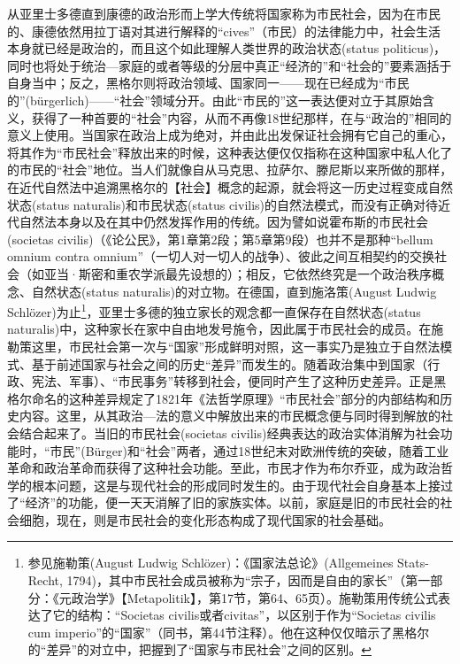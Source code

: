 从亚里士多德直到康德的政治形而上学大传统将国家称为市民社会，因为在市民的、康德依然用拉丁语对其进行解释的“cives”（市民）的法律能力中，社会生活本身就已经是政治的，而且这个如此理解人类世界的政治状态(status politicus)，同时也将处于统治—家庭的或者等级的分层中真正“经济的”和“社会的”要素涵括于自身当中；反之，黑格尔则将政治领域、国家同一——现在已经成为“市民的”(bürgerlich)——“社会”领域分开。由此“市民的”这一表达便对立于其原始含义，获得了一种首要的“社会”内容，从而不再像18世纪那样，在与“政治的”相同的意义上使用。当国家在政治上成为绝对，并由此出发保证社会拥有它自己的重心，将其作为“市民社会”释放出来的时候，这种表达便仅仅指称在这种国家中私人化了的市民的“社会”地位。当人们就像自从马克思、拉萨尔、滕尼斯以来所做的那样，在近代自然法中追溯黑格尔的【社会】概念的起源，就会将这一历史过程变成自然状态(status naturalis)和市民状态(status civilis)的自然法模式，而没有正确对待近代自然法本身以及在其中仍然发挥作用的传统。因为譬如说霍布斯的市民社会(societas civilis)（《论公民》，第1章第2段；第5章第9段）也并不是那种“bellum omnium contra omnium”（一切人对一切人的战争）、彼此之间互相契约的交换社会（如亚当·斯密和重农学派最先设想的）；相反，它依然终究是一个政治秩序概念、自然状态(status naturalis)的对立物。在德国，直到施洛策(August Ludwig Schlözer)为止\footnote{参见施勒策(August Ludwig Schlözer)：《国家法总论》(Allgemeines Stats-Recht, 1794)，其中市民社会成员被称为“宗子，因而是自由的家长”（第一部分：《元政治学》【Metapolitik】，第17节，第64、65页）。施勒策用传统公式表达了它的结构：“Societas civilis或者civitas”，以区别于作为“Societas civilis cum imperio”的“国家”（同书，第44节注释）。他在这种仅仅暗示了黑格尔的“差异”的对立中，把握到了“国家与市民社会”之间的区别。}，亚里士多德的独立家长的观念都一直保存在自然状态(status naturalis)中，这种家长在家中自由地发号施令，因此属于市民社会的成员。在施勒策这里，市民社会第一次与“国家”形成鲜明对照，这一事实乃是独立于自然法模式、基于前述国家与社会之间的历史“差异”而发生的。随着政治集中到国家（行政、宪法、军事）、“市民事务”转移到社会，便同时产生了这种历史差异。正是黑格尔命名的这种差异规定了1821年《法哲学原理》“市民社会”部分的内部结构和历史内容。这里，从其政治—法的意义中解放出来的市民概念便与同时得到解放的社会结合起来了。当旧的市民社会(societas civilis)经典表达的政治实体消解为社会功能时，“市民”(Bürger)和“社会”两者，通过18世纪末对欧洲传统的突破，随着工业革命和政治革命而获得了这种社会功能。至此，市民才作为布尔乔亚，成为政治哲学的根本问题，这是与现代社会的形成同时发生的。由于现代社会自身基本上接过了“经济”的功能，便一天天消解了旧的家族实体。以前，家庭是旧的市民社会的社会细胞，现在，则是市民社会的变化形态构成了现代国家的社会基础。


